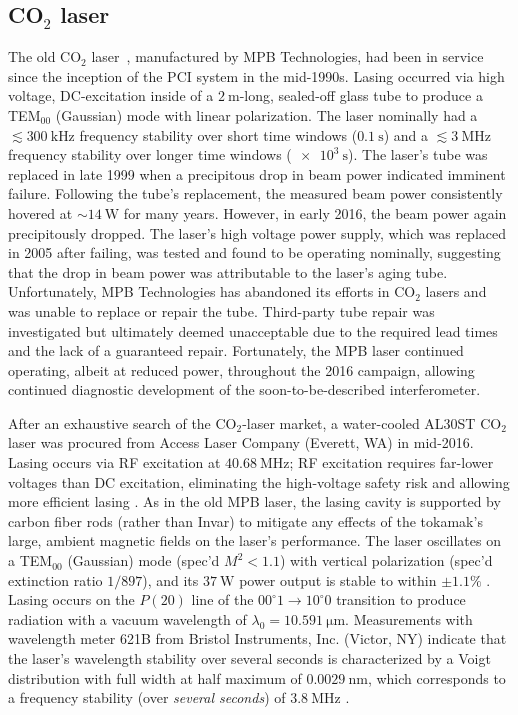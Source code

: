 \subsection{CO$_2$ laser}
The old CO$_2$ laser~\cite[Sec.~3.3]{coda_phd},
manufactured by MPB Technologies,
had been in service since
the inception of the \diiid \space PCI system in the mid-1990s.
Lasing occurred via high voltage, DC-excitation
inside of a $\SI{2}{\meter}$-long, sealed-off glass tube
to produce a TEM$_{00}$ (Gaussian) mode with linear polarization.
The laser nominally had
a $\lesssim \SI{300}{\kilo\hertz}$ frequency stability
over short time windows ($\SI{0.1}{\second}$) and
a $\lesssim \SI{3}{\mega\hertz}$ frequency stability
over longer time windows ($\SI{e3}{\second}$).
The laser's tube was replaced in late 1999
when a precipitous drop in beam power indicated imminent failure.
Following the tube's replacement,
the measured beam power consistently hovered at $\sim\SI{14}{\watt}$
for many years.
However, in early 2016, the beam power again precipitously dropped.
The laser's high voltage power supply,
which was replaced in 2005 after failing,
was tested and found to be operating nominally,
suggesting that the drop in beam power
was attributable to the laser's aging tube.
Unfortunately, MPB Technologies has abandoned its efforts in CO$_2$ lasers
and was unable to replace or repair the tube.
Third-party tube repair was investigated but
ultimately deemed unacceptable due to
the required lead times and the lack of a guaranteed repair.
Fortunately, the MPB laser continued operating, albeit at reduced power,
throughout the 2016 campaign, allowing continued diagnostic development
of the soon-to-be-described interferometer.

After an exhaustive search of the CO$_2$-laser market,
a water-cooled AL30ST CO$_2$ laser was procured
from Access Laser Company (Everett, WA) in mid-2016.
Lasing occurs via RF excitation at $\SI{40.68}{\mega\hertz}$;
RF excitation requires far-lower voltages than DC excitation,
eliminating the high-voltage safety risk and allowing more efficient lasing
\cite{he_jap83}.
As in the old MPB laser,
the lasing cavity is supported by carbon fiber rods (rather than Invar)
to mitigate any effects of the tokamak's large, ambient magnetic fields
on the laser's performance.
The laser oscillates on a TEM$_{00}$ (Gaussian) mode (spec'd $M^2 < 1.1$)
with vertical polarization (spec'd extinction ratio $1 / 897$), and
its $\SI{37}{\watt}$ power output is stable to within $\pm 1.1\%$
\cite{marinoni_AL30ST_report}.
Lasing occurs on the $P(20)$ line
of the $00^{\circ}1 \rightarrow 10^{\circ}0$ transition
to produce radiation with a vacuum wavelength of
$\lambda_0 = \SI{10.591}{\micro\meter}$.
Measurements with wavelength meter 621B
from Bristol Instruments, Inc. (Victor, NY)
indicate that the laser's wavelength stability over several seconds
is characterized by a Voigt distribution with
full width at half maximum of $\SI{0.0029}{\nano\meter}$, which
corresponds to a frequency stability (over \emph{several seconds})
of $\SI{3.8}{\mega\hertz}$ \cite{marinoni_AL30ST_report}.

